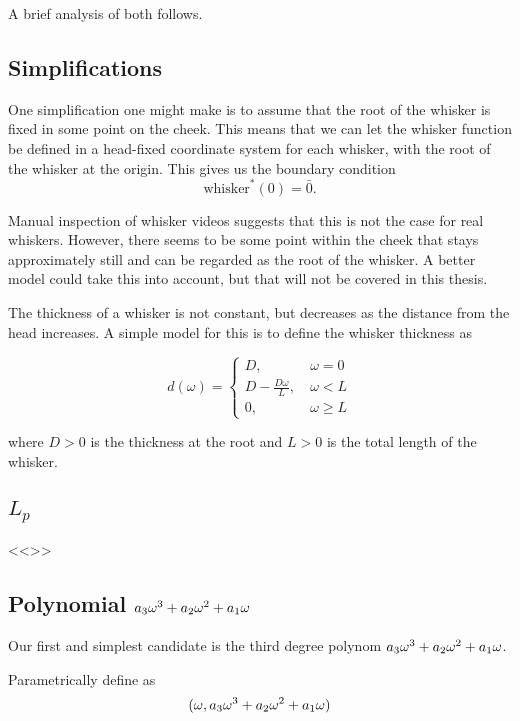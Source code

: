 A brief analysis of both follows.

\subsection{Simplifications}
One simplification one might make is to assume that the root of the
whisker is fixed in some point on the cheek. This means that we can
let the whisker function be defined in a head-fixed coordinate system
for each whisker, with the root of the whisker at the origin. This
gives us the boundary condition
\begin{equation}
    \label{eq:bv_root}
    \text{whisker}^*(0)=\bar{0}.
\end{equation}

Manual inspection of whisker videos suggests that this is not the case
for real whiskers. However, there seems to be some point within the
cheek that stays approximately still and can be regarded as the root
of the whisker. A better model could take this into account, but that
will not be covered in this thesis.

The thickness of a whisker is not constant, but decreases as the
distance from the head increases. A simple model for this is to define
the whisker thickness as

\begin{equation}
    d(\omega) = \begin{cases}
        D,~& \omega=0\\
        D-\frac{D\omega}{L},~& \omega<L\\
        0,~& \omega\ge L
    \end{cases}
\end{equation}

where $D>0$ is the thickness at the root and $L>0$ is the total length of the
whisker.


\subsection{$L_p$}
    <<>>

\subsection{Polynomial $a_3\omega^3+a_2\omega^2+a_1\omega$}

    Our first and simplest candidate is the third degree polynom $a_3\omega^3+a_2\omega^2+a_1\omega$.

    Parametrically define as
    \begin{equation}
        (\omega,a_3\omega^3+a_2\omega^2+a_1\omega)
    \end{equation}

